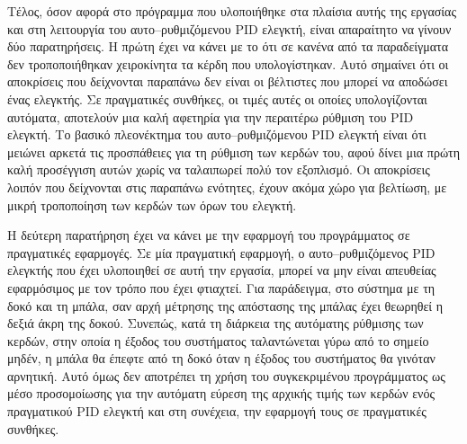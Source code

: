 Τέλος, όσον αφορά στο πρόγραμμα που υλοποιήθηκε στα πλαίσια αυτής της εργασίας και στη λειτουργία του αυτο--ρυθμιζόμενου PID ελεγκτή, είναι απαραίτητο να γίνουν δύο παρατηρήσεις. Η πρώτη έχει να κάνει με το ότι σε κανένα από τα παραδείγματα δεν τροποποιήθηκαν χειροκίνητα τα κέρδη που υπολογίστηκαν. Αυτό σημαίνει ότι οι αποκρίσεις που δείχνονται παραπάνω δεν είναι οι βέλτιστες που μπορεί να αποδώσει ένας ελεγκτής. Σε πραγματικές συνθήκες, οι τιμές αυτές οι οποίες υπολογίζονται αυτόματα, αποτελούν μια καλή αφετηρία για την περαιτέρω ρύθμιση του PID ελεγκτή. Το βασικό πλεονέκτημα του αυτο--ρυθμιζόμενου PID ελεγκτή είναι ότι μειώνει αρκετά τις προσπάθειες για τη ρύθμιση των κερδών του, αφού δίνει μια πρώτη καλή προσέγγιση αυτών χωρίς να ταλαιπωρεί πολύ τον εξοπλισμό. Οι αποκρίσεις λοιπόν που δείχνονται στις παραπάνω ενότητες, έχουν ακόμα χώρο για βελτίωση, με μικρή τροποποίηση των κερδών των όρων του ελεγκτή.

Η δεύτερη παρατήρηση έχει να κάνει με την εφαρμογή του προγράμματος σε πραγματικές εφαρμογές. Σε μία πραγματική εφαρμογή, ο αυτο--ρυθμιζόμενος PID ελεγκτής που έχει υλοποιηθεί σε αυτή την εργασία, μπορεί να μην είναι απευθείας εφαρμόσιμος με τον τρόπο που έχει φτιαχτεί. Για παράδειγμα, στο σύστημα με τη δοκό και τη μπάλα, σαν αρχή μέτρησης της απόστασης της μπάλας έχει θεωρηθεί η δεξιά άκρη της δοκού. Συνεπώς, κατά τη διάρκεια της αυτόματης ρύθμισης των κερδών, στην οποία η έξοδος του συστήματος ταλαντώνεται γύρω από το σημείο μηδέν, η μπάλα θα έπεφτε από τη δοκό όταν η έξοδος του συστήματος θα γινόταν αρνητική. Αυτό όμως δεν αποτρέπει τη χρήση του συγκεκριμένου προγράμματος ως μέσο προσομοίωσης για την αυτόματη εύρεση της αρχικής τιμής των κερδών ενός πραγματικού PID ελεγκτή και στη συνέχεια, την εφαρμογή τους σε πραγματικές συνθήκες.